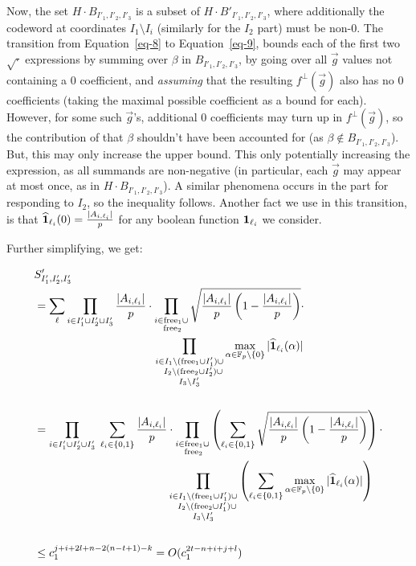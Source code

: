 Now, the set $H\cdot B_{I'_1,I'_2,I'_3}$ is a subset of $H\cdot B'_{I'_1,I'_2,I'_3}$, where additionally the codeword at coordinates $I_1\setminus I_i$ (similarly for the $I_2$ part) must be non-0. 
The transition from Equation~\ref{eq-8} to 
Equation~\ref{eq-9}, bounds each of the first two $\sqrt{\cdot}$ expressions by summing over $\beta$ in $B_{I'_1,I'_2,I'_3}$, by going over all $\vec{g}$ values not containing a $0$ coefficient, and \emph{assuming} that the resulting $f^\bot(\vec{g})$ also has no $0$ coefficients (taking the maximal possible coefficient as a bound for each).
However, for some such $\vec{g}$'s, additional $0$ coefficients may turn up in $f^\bot(\vec{g})$, so the contribution of that $\beta$ shouldn't have been accounted for (as $\beta\notin B_{I'_1,I'_2,I'_3}$). But, this may only increase the upper bound.
This only potentially increasing the expression, as all summands are non-negative (in particular, each $\vec{g}$ may appear at most once, as in $H\cdot B_{I'_1,I'_2,I'_3}$). A similar phenomena occurs in the part for responding to $I_2$, so the inequality follows.
Another fact we use in this transition, is that $\widehat{\mathbf{1}}_{\ell_i}(0)=\frac{|A_{i,\ell_i}|}{p}$ for any boolean function $\mathbf{1}_{\ell_i}$ we consider.

Further simplifying, we get:

\begin{align}
&S'_{I'_1,I'_2,I'_3} \nonumber\\ 
&=\sum_{\ell} \prod_{i\in I'_1 \cup I'_2 \cup I'_3}\frac{|A_{i,\ell_i}|}{p} \cdot \prod_{\substack{i\in \freeione\cup\\ \; \freeitwo}} \sqrt{\frac{|A_{i,\ell_i}|}{p}\left(1-\frac{|A_{i,\ell_i}|}{p}\right)}\cdot \label{A.13}\\
&\hphantom{{}==\prod_{i\in I'_1 \cup I'_2 \cup I'_3}\left(\frac{|A_{i,\ell_i}|}{p}\right)}\prod_{\substack{i\in I_1\setminus{(\freeione\cup I'_1})\cup\\ \;\;\; I_2\setminus{(\freeitwo\cup I'_2})\cup\\  I_3\setminus{I'_3}}} \max_{\alpha\in\F_p\setminus{\{0\}}} |\widehat{\mathbf{1}}_{\ell_i}(\alpha)| \nonumber\\ \nonumber \\
&=\prod_{i\in I'_1 \cup I'_2 \cup I'_3} \; \sum_{\ell_i\in \{0,1\}}\frac{|A_{i,\ell_i}|}{p} \cdot \prod_{\substack{i\in\freeione\cup\\ \; \freeitwo}}     \left(\sum_{\ell_i\in\{0,1\}}\sqrt{\frac{|A_{i,\ell_i}|}{p}\left(1-\frac{|A_{i,\ell_i}|}{p}\right)}\right)\cdot \nonumber\\
&\hphantom{{}=\prod_{i\in I'_1 \cup I'_2 \cup I'_3} \; \sum_{\ell_i\in \{0,1\}}\frac{|A_{i,\ell_i}|}{p}}\prod_{\substack{ i\in I_1\setminus{(\freeione\cup I'_1})\cup\\ \;\;\; I_2\setminus{(\freeitwo\cup I'_1})\cup\\ I_3\setminus{I'_3}}} \left(\sum_{\ell_i\in\{0,1\}}\max_{\alpha\in\F_p\setminus{\{0\}}}|\widehat{\mathbf{1}}_{\ell_i}(\alpha)|\right) \nonumber\\ \nonumber \\
&\leq c^{j + i + 2l + n - 2(n-t+1) - k}_1=O(c^{2t - n + i + j + l}_1) \label{A.15}
\end{align}

